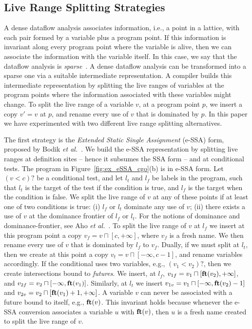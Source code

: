 \documentclass{sigplanconf}[10pt]
\newcommand{\fun}[1]{\mbox{\textbf{#1}}}
\begin{document}
\subsection{Live Range Splitting Strategies}
\label{sub:splitting}

A dense dataflow analysis associates information, i.e., a point in a lattice,
with each pair formed by a variable plus a program point.
If this information is invariant along every program point where the variable
is alive, then we can associate the information with the variable itself.
In this case, we say that the dataflow analysis is {\em sparse}~\cite{Choi91}.
A dense dataflow analysis can be transformed into a sparse one via a suitable
intermediate representation.
A compiler builds this intermediate representation by splitting the live ranges
of variables at the program points where the information associated with these
variables might change.
To split the live range of a variable $v$, at a program point $p$, we insert
a copy $v' = v$ at $p$, and rename every use of $v$ that is dominated by $p$.
In this paper we have experimented with two different live range splitting
alternatives.

The first strategy is the {\em Extended Static Single Assignment} (e-SSA) form,
proposed by Bodik {\em et al.}~\cite{Bodik00}.
We build the e-SSA representation by splitting live ranges at definition sites
-- hence it subsumes the SSA form -- and at conditional tests.
The program in Figure~\ref{fig:ex_eSSA_cgo}(b) is in e-SSA form.
Let $(v < c)?$ be a conditional test, and let $l_t$ and $l_f$ be labels in
the program, such that $l_t$ is the target of the test if the condition is true,
and $l_f$ is the target when the condition is false.
We split the live range of $v$ at any of these points if at least one of two
conditions is true:
(i) $l_f$ or $l_t$ dominate any use of $v$;
(ii) there exists a use of $v$ at the dominance frontier of $l_f$ or $l_t$.
For the notions of dominance and dominance-frontier, see Aho
{\em et al.}~\cite[p.656]{Aho06}.
To split the live range of $v$ at $l_f$ we insert at this
program point a copy $v_f = v \sqcap [c, +\infty]$, where $v_f$ is a fresh name.
We then rename every use of $v$ that is dominated by $l_f$ to $v_f$.
Dually, if we must split at $l_t$, then we create at this point a copy
$v_t = v \sqcap [-\infty, c-1]$, and rename variables accordingly.
If the conditional uses two variables, e.g., $(v_1 < v_2)?$, then we create
intersections bound to {\em futures}.
We insert, at $l_f$, $v_{1f} = v_1 \sqcap [\fun{ft}(v_2), +\infty]$,
and $v_{2f} = v_2 \sqcap [-\infty, \fun{ft}(v_1)]$.
Similarly, at $l_t$ we insert
$v_{1v} = v_1 \sqcap [-\infty, \fun{ft}(v_2) - 1]$
and $v_{2v} = v_2 \sqcap [\fun{ft}(v_1) + 1, +\infty]$.
A variable $v$ can never be associated with a future bound to
itself, e.g., $\fun{ft}(v)$.
This invariant holds because whenever the e-SSA conversion associates a variable
$u$ with $\fun{ft}(v)$, then $u$ is a fresh name created to split the live range
of $v$.
\end{document}
